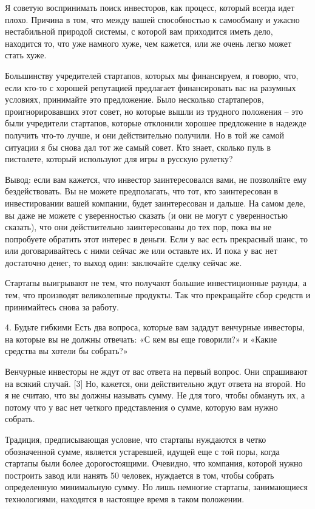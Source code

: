 \documentclass[ebook,12pt,oneside,openany]{memoir}
\begin{document}
Я советую воспринимать поиск инвесторов, как процесс, который всегда
идет плохо. Причина в том, что между вашей способностью к самообману и
ужасно нестабильной природой системы, с которой вам приходится иметь
дело, находится то, что уже намного хуже, чем кажется, или же очень
легко может стать хуже.

Большинству учредителей стартапов, которых мы финансируем, я говорю,
что, если кто-то с хорошей репутацией предлагает финансировать вас на
разумных условиях, принимайте это предложение. Было несколько
стартаперов, проигнорировавших этот совет, но которые вышли из
трудного положения – это были учредители стартапов, которые отклонили
хорошее предложение в надежде получить что-то лучше, и они
действительно получили. Но в той же самой ситуации я бы снова дал тот
же самый совет. Кто знает, сколько пуль в пистолете, который
используют для игры в русскую рулетку?

Вывод: если вам кажется, что инвестор заинтересовался вами, не
позволяйте ему бездействовать. Вы не можете предполагать, что тот, кто
заинтересован в инвестировании вашей компании, будет заинтересован и
дальше. На самом деле, вы даже не можете с уверенностью сказать (и они
не могут с уверенностью сказать), что они действительно заинтересованы
до тех пор, пока вы не попробуете обратить этот интерес в деньги. Если
у вас есть прекрасный шанс, то или договаривайтесь с ними сейчас же
или оставьте их. И пока у вас нет достаточно денег, то выход один:
заключайте сделку сейчас же.

Стартапы выигрывают не тем, что получают большие инвестиционные
раунды, а тем, что производят великолепные продукты. Так что
прекращайте сбор средств и принимайтесь снова за работу.

4. Будьте гибкими Есть два вопроса, которые вам зададут венчурные
инвесторы, на которые вы не должны отвечать: «С кем вы еще говорили?»
и «Какие средства вы хотели бы собрать?»

Венчурные инвесторы не ждут от вас ответа на первый вопрос. Они
спрашивают на всякий случай. [3] Но, кажется, они действительно ждут
ответа на второй. Но я не считаю, что вы должны называть сумму. Не для
того, чтобы обмануть их, а потому что у вас нет четкого представления
о сумме, которую вам нужно собрать.

Традиция, предписывающая условие, что стартапы нуждаются в четко
обозначенной сумме, является устаревшей, идущей еще с той поры, когда
стартапы были более дорогостоящими. Очевидно, что компания, которой
нужно построить завод или нанять 50 человек, нуждается в том, чтобы
собрать определенную минимальную сумму. Но лишь немногие стартапы,
занимающиеся технологиями, находятся в настоящее время в таком
положении.
\end{document}

